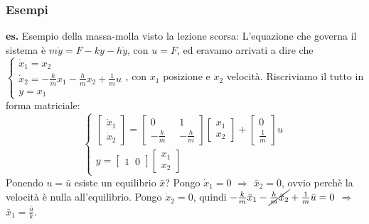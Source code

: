 \subsubsection*{Esempi}
\textbf{es.} Esempio della massa-molla visto la lezione scorsa:\newline
L'equazione che governa il sistema è $m \ddot{y} = F - ky - h \dot{y}$, con $u = F$, ed eravamo arrivati a dire che $\begin{cases}
    \dot{x}_1 = x_2\\
    \dot{x}_2 = - \frac{k}{m}x_1 - \frac{h}{m}x_2 + \frac{1}{m}u\\
    y = x_1
\end{cases}$, con $x_1$ posizione e $x_2$ velocità.\newline
Riscriviamo il tutto in forma matriciale:
\[
    \begin{cases}
        \left[\begin{matrix}
            \dot{x}_1\\
            \dot{x}_2
        \end{matrix}\right] = \left[\begin{matrix}
            0 \;\; &1\\
            - \frac{k}{m} \;\;& - \frac{h}{m}
        \end{matrix}\right] \left[\begin{matrix}
            x_1\\
            x_2
        \end{matrix}\right] + \left[\begin{matrix}
            0 \\
            \frac{1}{m}
        \end{matrix}\right] u\\
        y = \left[\begin{matrix}
            1 \;\;0
        \end{matrix}\right] \left[\begin{matrix}
            x_1\\
            x_2
        \end{matrix}\right]
    \end{cases}
\]
Ponendo $u = \bar{u}$ esiste un equilibrio $\bar{x}$?\newline
Pongo $\dot{x}_1 = 0$ $\Longrightarrow$ $\bar{x}_2 = 0$, ovvio perchè la velocità è nulla all'equilibrio.\newline
Pongo $\dot{x}_2 = 0$, quindi $- \frac{k}{m} \bar{x}_1 - \cancel{ \frac{h}{m}\bar{x}_2} + \frac{1}{m}\bar{u} = 0$ $\Longrightarrow$ $\bar{x}_1 = \frac{\bar{u}}{k}$.\newline
